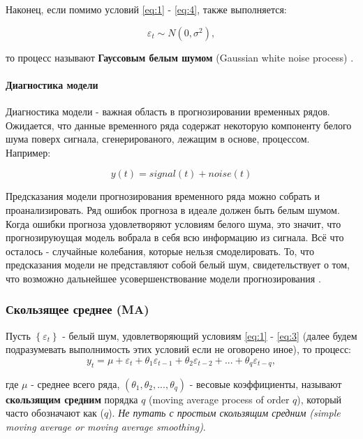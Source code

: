 Наконец, если помимо условий \eqref{eq:1} - \eqref{eq:4}, также выполняется:

\begin{equation*}
    \varepsilon_t \sim N(0, \sigma^2),
\end{equation*}

то процесс называют \textbf{Гауссовым белым шумом} (Gaussian white noise 
process) \cite{TSA_Hamilton}.

\paragraph{Диагностика модели}

Диагностика модели - важная область в прогнозировании временных рядов. 
Ожидается, что данные временного ряда содержат некоторую компоненту 
белого шума поверх сигнала, сгенерированого, лежащим в основе, процессом. 
Например: 

\begin{equation*}
    y(t) = signal(t) + noise(t)
\end{equation*}

Предсказания модели прогнозирования временного ряда можно собрать и 
проанализировать. Ряд ошибок прогноза в идеале должен быть белым шумом. 
Когда ошибки прогноза удовлетворяют условиям белого шума, это значит, 
что прогнозируюущая модель вобрала в себя всю информацию из сигнала. 
Всё что осталось - случайные колебания, которые нельзя смоделировать. 
То, что предсказания модели не представляют собой белый шум, 
свидетельствует о том, что возможно дальнейшее усовершенствование 
модели прогнозирования \cite{Forecasting_Brownlee}.

\subsubsection{Скользящее среднее (MA)}

Пусть $\left\{ \varepsilon_t \right\}$ - белый шум, удовлетворяющий условиям 
\eqref{eq:1} - \eqref{eq:3} (далее будем подразумевать выполнимость этих 
условий если не оговорено иное), то процесс:
\begin{equation*}
    y_t = \mu + \varepsilon_t + \theta_1 \varepsilon_{t-1} + 
    \theta_2 \varepsilon_{t-2} + ... + \theta_q \varepsilon_{t-q},
\end{equation*}

где $\mu$ - среднее всего ряда, $(\theta_1, \theta_2, ..., \theta_q)$ - 
весовые коэффициенты, называют \textbf{скользящим средним} порядка $q$ 
(moving average process of order $q$), который часто 
обозначают как ($q$). \textit{Не путать с простым 
скользящим средним (simple moving average or moving average smoothing)}.

